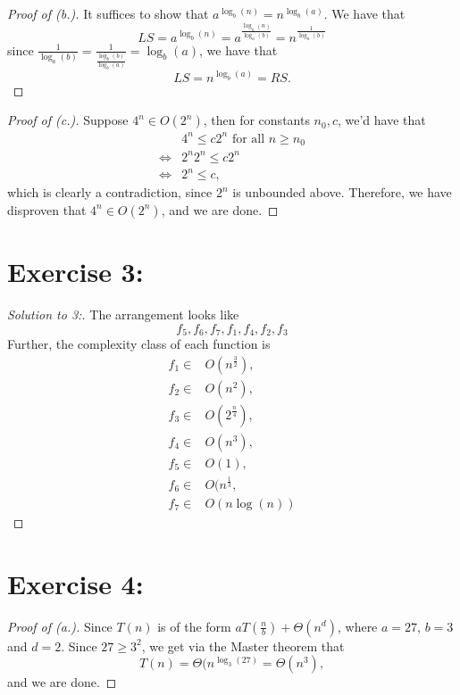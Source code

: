 \documentclass{article}
\begin{document}
\begin{proof}[Proof of (b.)]
It suffices to show that $a^{\log_{b}(n)} = n^{\log_{b}(a)}$. We have that \[
LS = a^{\log_{b}(n)}= a^{ \frac{\log_{a}(n)}{\log_{a}(b)}} = n^{\frac{1}{\log_{a}(b)}}
\]  since $\frac{1}{\log_{a}(b)} = \frac{1}{ \frac{\log_{b}(b)}{\log_{b}(a)}}= \log_{b}(a)$, we
have that \[
LS = n^{\log_{b}(a)} = RS.
\] 
\end{proof}

\begin{proof}[Proof of (c.)]
    Suppose $4^{n} \in O(2^{n})$, then for constants $n_0,c$, we'd have that 
\begin{align*}
    & 4^{n} \leq  c 2^{n} \text{ for all } n\geq  n_0 \\
    \iff & 2^{n}2^{n} \leq  c 2 ^{n}  \\
    \iff &  2^{n} \leq  c,
\end{align*} which is clearly a contradiction, since $2^{n}$ is unbounded above. Therefore, we have
disproven that $4^{n} \in O(2^{n})$, and we are done.
\end{proof}

\section*{Exercise 3:}
\begin{proof}[Solution to 3:]
    The arrangement looks like \[
    f_5,f_6,f_7,f_1,f_4,f_2,f_3
    \] Further, the complexity class of each function is
 \begin{align*}
     f_1 \in & O(n^{\frac{3}{2}}), \\
     f_2 \in & O(n^2), \\
     f_3 \in & O(2^{\frac{n}{4}}), \\ 
     f_4 \in & O(n^{3}), \\
     f_5 \in & O(1), \\
     f_6 \in & O(n^{\frac{1}{3}}, \\
     f_7 \in & O(n\log(n))
 \end{align*}
\end{proof}

\section*{Exercise 4:}
\begin{proof}[Proof of (a.)]
Since $T(n)$ is of the form $aT \left( \frac{n}{b} \right) + \Theta(n^{d})$, where $a = 27$, 
$b=3$ and $d= 2$. Since $27 \geq  3^{2}$, we get via the Master theorem that \[
T(n) = \Theta(n^{\log_{3}(27)} = \Theta(n^{3}),
\]  and we are done.
\end{proof}
\end{document}
